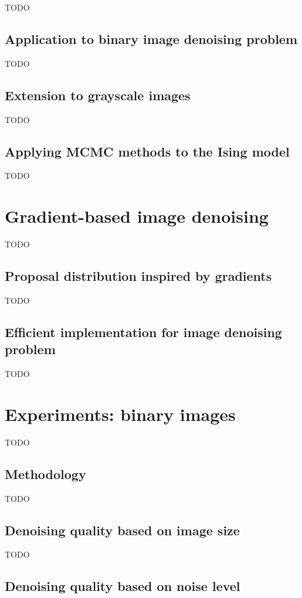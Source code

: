 \documentclass[a4paper, 11pt, onecolumn, openany, titlepage]{report}
\newcommand\numberedchapter[1]{\setlength\topskip{3cm}\chapter{#1}\setlength\topskip{0cm}}
\theoremstyle{default_theorem_style}\newtheorem{theorem}{Theorem}
\theoremstyle{default_theorem_style}\newtheorem{definition}{Definition}
\begin{document}
TODO

\section{Application to binary image denoising problem}

TODO

\section{Extension to grayscale images}

TODO

\section{Applying MCMC methods to the Ising model}

TODO

\numberedchapter{Gradient-based image denoising}

TODO

\section{Proposal distribution inspired by gradients}

TODO

\section{Efficient implementation for image denoising problem}

TODO

\numberedchapter{Experiments: binary images}

TODO

\section{Methodology}

TODO

\section{Denoising quality based on image size}

TODO

\section{Denoising quality based on noise level}
\end{document}
